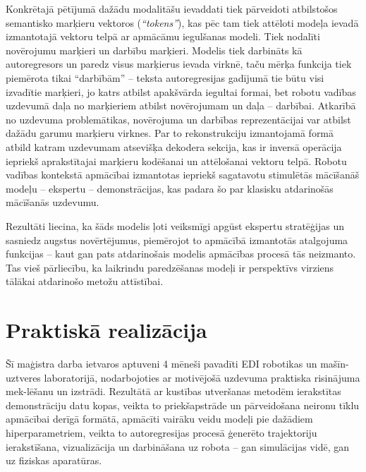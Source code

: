 \documentclass[12pt, a4paper]{article}
\numberwithin{equation}{section} %
\begin{document}
Konkrētajā pētījumā dažādu modalitāšu ievaddati tiek pārveidoti atbilstošos semantisko marķieru vektoros (\textit{``tokens''}), kas pēc tam tiek attēloti modeļa ievadā izmantotajā vektoru telpā ar apmācāmu iegulšanas modeli. Tiek nodalīti novērojumu marķieri un darbību marķieri. Modelis tiek darbināts kā autoregresors un paredz visus marķierus ievada virknē, taču mērķa funkcija tiek piemērota tikai ``darbībām'' -- teksta autoregresijas gadījumā tie būtu visi izvadītie marķieri, jo katrs atbilst apakšvārda iegultai formai, bet robotu vadības uzdevumā daļa no marķieriem atbilst novērojumam un daļa -- darbībai. Atkarībā no uzdevuma problemātikas, novērojuma un darbības reprezentācijai var atbilst dažādu garumu marķieru virknes. Par to rekonstrukciju izmantojamā formā atbild katram uzdevumam atsevišķa dekodera sekcija, kas ir inversā operācija iepriekš aprakstītajai marķieru kodēšanai un attēlošanai vektoru telpā. Robotu vadības kontekstā apmācībai izmantotas iepriekš sagatavotu stimulētās mācīšanāš modeļu -- ekspertu -- demonstrācijas, kas padara šo par klasisku atdarinošās mācīšanās uzdevumu. 

Rezultāti liecina, ka šāds modelis ļoti veiksmīgi apgūst ekspertu stratēģijas un sasniedz augstus novērtējumus, piemērojot to apmācībā izmantotās atalgojuma funkcijas -- kaut gan pats atdarinošais modelis apmācības procesā tās neizmanto. Tas vieš pārliecību, ka laikrindu paredzēšanas modeļi ir perspektīvs virziens tālākai atdarinošo metožu attīstībai.



%
%
%
%
%
%
%
%
%
%
%
%
%
%
%
%
%
%
%

\newpage
\section{Praktiskā realizācija}

Šī maģistra darba ietvaros aptuveni 4 mēneši pavadīti EDI robotikas un mašīn-uztveres laboratorijā, nodarbojoties ar motivējošā uzdevuma praktiska risinājuma mek-lēšanu un izstrādi. Rezultātā ar kustības utveršanas metodēm ierakstītas demonstrāciju datu kopas, veikta to priekšapstrāde un pārveidošana neironu tīklu apmācībai derīgā formātā, apmācīti vairāku veidu modeļi pie dažādiem hiperparametriem, veikta to autoregresijas procesā ģenerēto trajektoriju ierakstīšana, vizualizācija un darbināšana uz robota -- gan simulācijas vidē, gan uz fiziskas aparatūras.
\end{document}
